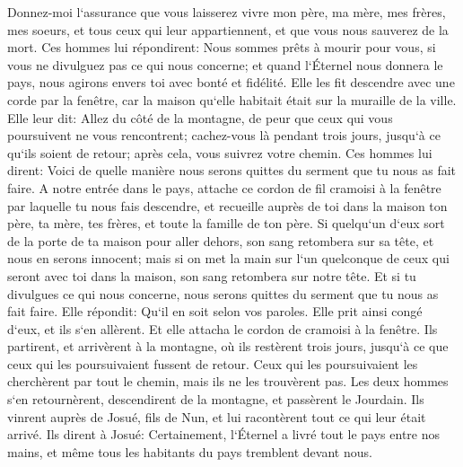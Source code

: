 \verse Donnez-moi l`assurance que vous laisserez vivre mon père, ma mère, mes frères, mes soeurs, et tous ceux qui leur appartiennent, et que vous nous sauverez de la mort. 
\verse Ces hommes lui répondirent: Nous sommes prêts à mourir pour vous, si vous ne divulguez pas ce qui nous concerne; et quand l`Éternel nous donnera le pays, nous agirons envers toi avec bonté et fidélité. 
\verse Elle les fit descendre avec une corde par la fenêtre, car la maison qu`elle habitait était sur la muraille de la ville. 
\verse Elle leur dit: Allez du côté de la montagne, de peur que ceux qui vous poursuivent ne vous rencontrent; cachez-vous là pendant trois jours, jusqu`à ce qu`ils soient de retour; après cela, vous suivrez votre chemin. 
\verse Ces hommes lui dirent: Voici de quelle manière nous serons quittes du serment que tu nous as fait faire. 
\verse A notre entrée dans le pays, attache ce cordon de fil cramoisi à la fenêtre par laquelle tu nous fais descendre, et recueille auprès de toi dans la maison ton père, ta mère, tes frères, et toute la famille de ton père. 
\verse Si quelqu`un d`eux sort de la porte de ta maison pour aller dehors, son sang retombera sur sa tête, et nous en serons innocent; mais si on met la main sur l`un quelconque de ceux qui seront avec toi dans la maison, son sang retombera sur notre tête. 
\verse Et si tu divulgues ce qui nous concerne, nous serons quittes du serment que tu nous as fait faire. 
\verse Elle répondit: Qu`il en soit selon vos paroles. Elle prit ainsi congé d`eux, et ils s`en allèrent. Et elle attacha le cordon de cramoisi à la fenêtre. 
\verse Ils partirent, et arrivèrent à la montagne, où ils restèrent trois jours, jusqu`à ce que ceux qui les poursuivaient fussent de retour. Ceux qui les poursuivaient les cherchèrent par tout le chemin, mais ils ne les trouvèrent pas. 
\verse Les deux hommes s`en retournèrent, descendirent de la montagne, et passèrent le Jourdain. Ils vinrent auprès de Josué, fils de Nun, et lui racontèrent tout ce qui leur était arrivé. 
\verse Ils dirent à Josué: Certainement, l`Éternel a livré tout le pays entre nos mains, et même tous les habitants du pays tremblent devant nous. 

\chapter{}

